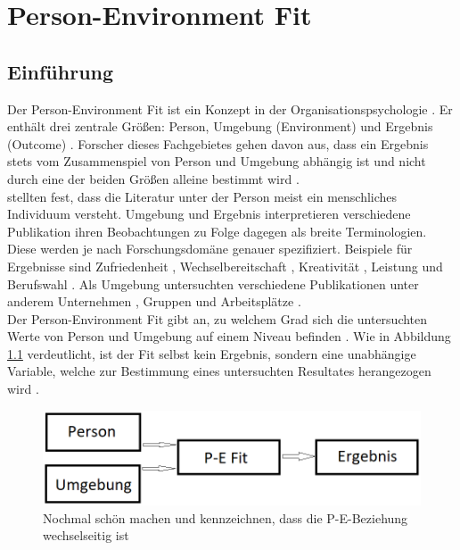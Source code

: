 \chapter{Person-Environment Fit}
\label{ch:personEnvironmentFit}

\section{Einführung}
\label{ch:personEnvironmentFit:einfuehrung}
Der Person-Environment Fit ist ein Konzept in der Organisationspsychologie \cite[S. 1f.]{edwards:2008}. Er enthält drei zentrale Größen: Person, Umgebung (Environment) und Ergebnis (Outcome) \cite[S. 2f.]{livingstone:1997}. Forscher dieses Fachgebietes gehen davon aus, dass ein Ergebnis stets vom Zusammenspiel von Person und Umgebung abhängig ist und nicht durch eine der beiden Größen alleine bestimmt wird \cite[S. 1]{muchinsky:1987}.\\
\textcite[S. 5]{edwards:2007} stellten fest, dass die Literatur unter der Person meist ein menschliches Individuum versteht. Umgebung und Ergebnis interpretieren verschiedene Publikation ihren Beobachtungen zu Folge dagegen als breite Terminologien. Diese werden je nach Forschungsdomäne genauer spezifiziert. Beispiele für Ergebnisse sind Zufriedenheit \cite[S. 1]{lashani:2021}, Wechselbereitschaft \cite[S. 1]{amarneh:2021}, Kreativität \cite[S. 1]{duan:2019}, Leistung \cite[S. 7f.]{elfenbein:2007} und  Berufswahl \cite[S. 1]{cable:1996}. Als Umgebung untersuchten verschiedene Publikationen unter anderem Unternehmen \cite[S. 1]{kristof:1996}, Gruppen \cite[S. 1]{werbel:2001} und Arbeitsplätze \cite[S. 1]{lu:2014}.\\
Der Person-Environment Fit gibt an, zu welchem Grad sich die untersuchten Werte von Person und Umgebung auf einem Niveau befinden \cite[S. 3]{chatman:1989}. Wie in Abbildung \ref{fig:personEnvironmentFit:einfuehrung:abb1} verdeutlicht, ist der Fit selbst kein Ergebnis, sondern eine unabhängige Variable, welche zur Bestimmung eines untersuchten Resultates herangezogen wird \cite[S. 4f.]{edwards:1991}.\\
\begin{figure}[h]
	\centering
	\includegraphics[width=1\textwidth]{gfx/P-E Fit.png}
	\caption{Nochmal schön machen und kennzeichnen, dass die P-E-Beziehung wechselseitig ist}
	\label{fig:personEnvironmentFit:einfuehrung:abb1}
\end{figure}\\
